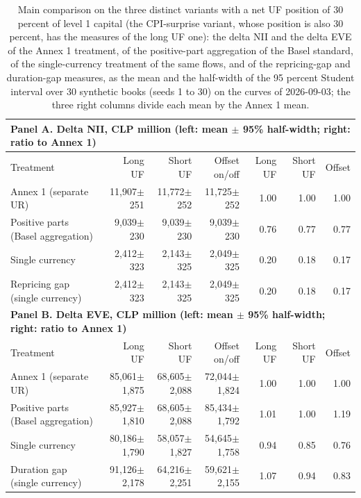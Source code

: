 \begin{table}[htbp]
\centering
\footnotesize
\setlength{\tabcolsep}{3.5pt}
\caption{Main comparison on the three distinct variants with a net UF position of 30 percent of level 1 capital (the CPI-surprise variant, whose position is also 30 percent, has the measures of the long UF one): the delta NII and the delta EVE of the Annex 1 treatment, of the positive-part aggregation of the Basel standard, of the single-currency treatment of the same flows, and of the repricing-gap and duration-gap measures, as the mean and the half-width of the 95 percent Student interval over 30 synthetic books (seeds 1 to 30) on the curves of 2026-09-03; the three right columns divide each mean by the Annex 1 mean.}
\label{tab:main-results}
\begin{tabular}{lrrrrrr}
\toprule
\multicolumn{7}{l}{\textbf{Panel A. Delta NII, CLP million (left: mean $\pm$ 95\% half-width; right: ratio to Annex 1)}} \\
\midrule
Treatment & Long UF & Short UF & Offset on/off & Long UF & Short UF & Offset \\
\midrule
Annex 1 (separate UR) & 11{,}907$\pm$251 & 11{,}772$\pm$252 & 11{,}725$\pm$252 & 1.00 & 1.00 & 1.00 \\
Positive parts (Basel aggregation) & 9{,}039$\pm$230 & 9{,}039$\pm$230 & 9{,}039$\pm$230 & 0.76 & 0.77 & 0.77 \\
Single currency & 2{,}412$\pm$323 & 2{,}143$\pm$325 & 2{,}049$\pm$325 & 0.20 & 0.18 & 0.17 \\
Repricing gap (single currency) & 2{,}412$\pm$323 & 2{,}143$\pm$325 & 2{,}049$\pm$325 & 0.20 & 0.18 & 0.17 \\
\midrule
\multicolumn{7}{l}{\textbf{Panel B. Delta EVE, CLP million (left: mean $\pm$ 95\% half-width; right: ratio to Annex 1)}} \\
\midrule
Treatment & Long UF & Short UF & Offset on/off & Long UF & Short UF & Offset \\
\midrule
Annex 1 (separate UR) & 85{,}061$\pm$1{,}875 & 68{,}605$\pm$2{,}088 & 72{,}044$\pm$1{,}824 & 1.00 & 1.00 & 1.00 \\
Positive parts (Basel aggregation) & 85{,}927$\pm$1{,}810 & 68{,}605$\pm$2{,}088 & 85{,}434$\pm$1{,}792 & 1.01 & 1.00 & 1.19 \\
Single currency & 80{,}186$\pm$1{,}790 & 58{,}057$\pm$1{,}827 & 54{,}645$\pm$1{,}758 & 0.94 & 0.85 & 0.76 \\
Duration gap (single currency) & 91{,}126$\pm$2{,}178 & 64{,}216$\pm$2{,}251 & 59{,}621$\pm$2{,}155 & 1.07 & 0.94 & 0.83 \\
\bottomrule
\end{tabular}
\end{table}
